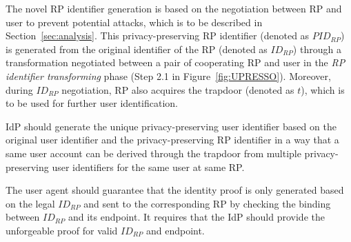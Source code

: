 \vspace{1mm} The novel RP identifier generation is based on the negotiation between RP and user to prevent potential attacks, which is to be described in Section~\ref{sec:analysis}. This privacy-preserving RP identifier (denoted as $PID_{RP}$) is generated from the original identifier of the RP (denoted as $ID_{RP}$) through a transformation negotiated between a pair of cooperating RP and user in the \emph{RP identifier transforming} phase (Step 2.1 in Figure~\ref{fig:UPRESSO}). Moreover, during $ID_{RP}$ negotiation, RP also acquires the trapdoor (denoted as $t$), which is to be used for further user identification.

\vspace{1mm} IdP should generate the unique privacy-preserving user identifier based on the original user identifier and the privacy-preserving RP identifier in a way that a same user account can be derived through the trapdoor from multiple privacy-preserving user identifiers for the same user at same RP.

\vspace{1mm} The user agent should guarantee that the identity proof is only generated based on the legal $ID_{RP}$ and sent to the corresponding RP by checking the binding between $ID_{RP}$ and its endpoint. It requires that the IdP should provide the unforgeable proof for valid $ID_{RP}$ and endpoint.


